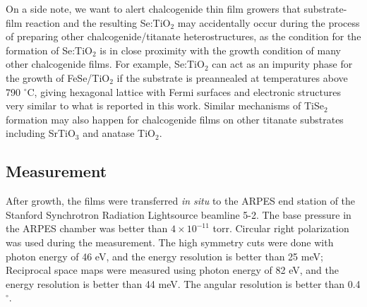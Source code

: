 \documentclass[journal=nalefd,manuscript=letter]{achemso}
\begin{document}
On a side note, we want to alert chalcogenide thin film growers that substrate-film reaction and the resulting Se:TiO$_2$ may accidentally occur during the process of preparing other chalcogenide/titanate heterostructures, as the condition for the formation of Se:TiO$_2$ is in close proximity with the growth condition of many other chalcogenide films. 
For example, Se:TiO$_2$ can act as an impurity phase for the growth of FeSe/TiO$_2$ if the substrate is preannealed at temperatures above 790 $^\circ$C, giving hexagonal lattice with Fermi surfaces and electronic structures very similar to what is reported in this work.
Similar mechanisms of TiSe$_2$ formation may also happen for chalcogenide films on other titanate substrates including SrTiO$_3$ and anatase TiO$_2$.

\subsection*{Measurement}
After growth, the films were transferred \textit{in situ} to the ARPES end station of the Stanford Synchrotron Radiation Lightsource beamline 5-2. 
The base pressure in the ARPES chamber was better than $4\times10^{-11}$ torr.
Circular right polarization was used during the measurement. The high symmetry cuts were done with photon energy of 46 eV, and the energy resolution is better than 25 meV; Reciprocal space maps were measured using photon energy of 82 eV, and the energy resolution is better than 44 meV. The angular resolution is better than 0.4$^\circ$.
\end{document}
